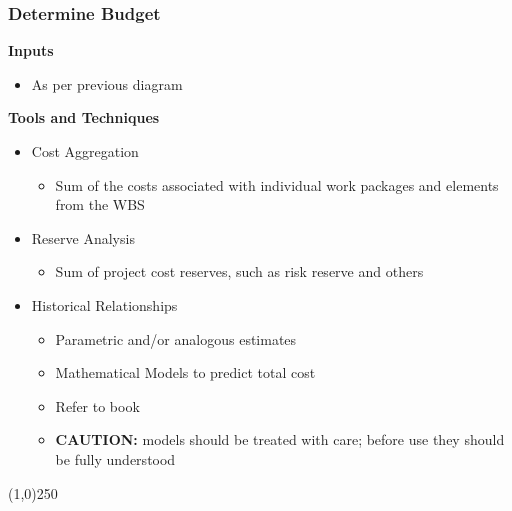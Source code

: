 \begin{frame}
\frametitle{Determine Budget}
\textbf{Inputs}
\begin{itemize}
	\item As per previous diagram
\end{itemize}
\textbf{Tools and Techniques}
\begin{itemize}
	\item Cost Aggregation
	\begin{itemize}
		\item Sum of the costs associated with individual work packages and elements from the WBS
	\end{itemize}
	\item Reserve Analysis
	\begin{itemize}
		\item Sum of project cost reserves, such as risk reserve and others
	\end{itemize}
	\item Historical Relationships
	\begin{itemize}
		\item Parametric and/or analogous estimates
		\item Mathematical Models to predict total cost
		\item Refer to book 
		\item\textbf{CAUTION:} models should be treated with care; before use they should be fully understood
	\end{itemize}
\end{itemize}
\end{frame}
\begin{center}\line(1,0){250}\end{center}






